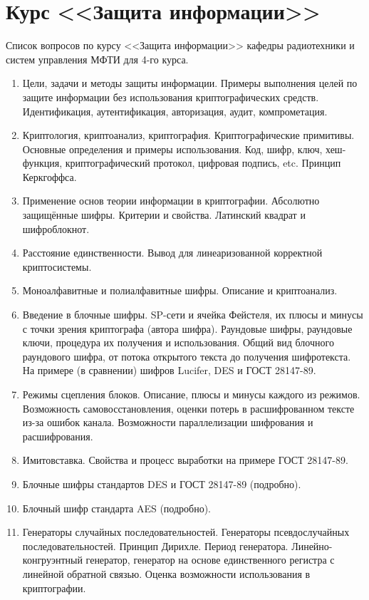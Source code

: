 \section{Курс <<Защита информации>>}

Список вопросов по курсу <<Защита информации>> кафедры радиотехники и систем управления МФТИ для 4-го курса.

\begin{enumerate}
    \item Цели, задачи и методы защиты информации. Примеры выполнения целей по защите информации без использования криптографических средств. Идентификация, аутентификация, авторизация, аудит, компрометация.
    \item Криптология, криптоанализ, криптография. Криптографические примитивы. Основные определения и примеры использования. Код, шифр, ключ, хеш-функция, криптографический протокол, цифровая подпись, etc. Принцип Керкгоффса.
    \item Применение основ теории информации в криптографии. Абсолютно защищённые шифры. Критерии и свойства. Латинский квадрат и шифроблокнот.
    \item Расстояние единственности. Вывод для линеаризованной корректной криптосистемы.
    \item Моноалфавитные и полиалфавитные шифры. Описание и криптоанализ.
    \item Введение в блочные шифры. SP-сети и ячейка Фейстеля, их плюсы и минусы с точки зрения криптографа (автора шифра). Раундовые шифры, раундовые ключи, процедура их получения и использования. Общий вид блочного раундового шифра, от потока открытого текста до получения шифротекста. На примере (в сравнении) шифров Lucifer, DES и ГОСТ 28147-89.
    \item Режимы сцепления блоков. Описание, плюсы и минусы каждого из режимов. Возможность самовосстановления, оценки потерь в расшифрованном тексте из-за ошибок канала. Возможности параллелизации шифрования и расшифрования.
    \item Имитовставка. Свойства и процесс выработки на примере ГОСТ 28147-89.
    \item Блочные шифры стандартов DES и ГОСТ 28147-89 (подробно).
    \item Блочный шифр стандарта AES (подробно).
    \item Генераторы случайных последовательностей. Генераторы псевдослучайных последовательностей. Принцип Дирихле. Период генератора. Линейно-конгруэнтный генератор, генератор на основе единственного регистра с линейной обратной связью. Оценка возможности использования в криптографии.

\end{enumerate}
